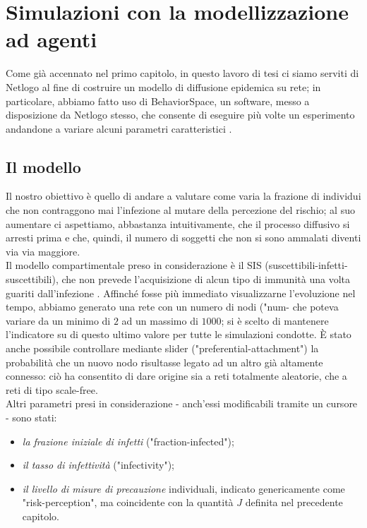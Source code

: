 \chapter{Simulazioni con la modellizzazione ad agenti}
\label{chap:cap4}
Come già accennato nel primo capitolo, in questo lavoro di tesi ci siamo serviti di Netlogo al fine di costruire un modello di diffusione epidemica su rete; in particolare, abbiamo fatto uso di BehaviorSpace, un software, messo a disposizione da Netlogo stesso, che consente di eseguire più volte un esperimento andandone a variare alcuni parametri caratteristici \cite{Wilensky2}. 
\section{Il modello}
Il nostro obiettivo è quello di andare a valutare come varia la frazione di individui che non contraggono mai l'infezione al mutare della percezione del rischio; al suo aumentare ci aspettiamo, abbastanza intuitivamente, che il processo diffusivo si arresti prima e che, quindi, il numero di soggetti che non si sono ammalati diventi via via maggiore. \\Il modello compartimentale preso in considerazione è il SIS (suscettibili-infetti-suscettibili), che non prevede l'acquisizione di alcun tipo di immunità una volta guariti dall'infezione \cite{Brauer}. Affinché fosse più immediato visualizzarne l'evoluzione nel tempo, abbiamo generato una rete con un numero di nodi ("num- che poteva variare da un minimo di $ 2 $ ad un massimo di $ 1000 $; si è scelto di mantenere l'indicatore su di questo ultimo valore per tutte le simulazioni condotte. \`{E} stato anche possibile controllare mediante slider ("preferential-attachment") la probabilità che un nuovo nodo risultasse legato ad un altro già altamente connesso: ciò ha consentito di dare origine sia a reti totalmente aleatorie, che a reti di tipo scale-free. \\Altri parametri presi in considerazione - anch'essi modificabili tramite un cursore - sono stati:
\begin{itemize}
\item \textit{la frazione iniziale di infetti} ("fraction-infected");
\item \textit{il tasso di infettività} ("infectivity");
\item \textit{il livello di misure di precauzione} individuali, indicato genericamente come "risk-perception", ma coincidente con la quantità $ J $ definita nel precedente capitolo.
\end{itemize}
